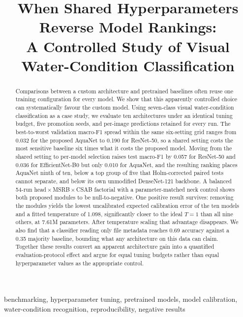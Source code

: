 \documentclass[10pt,journal]{IEEEtran}
\title{When Shared Hyperparameters Reverse Model Rankings:\\A Controlled Study of Visual
Water-Condition Classification}
\author{\todo{author names, affiliations and ORCIDs before submission}}
\newcommand{\mf}{macro-F1}
\begin{document}
\maketitle

\begin{abstract}
Comparisons between a custom architecture and pretrained baselines often reuse one training
configuration for every model. We show that this apparently controlled choice can
systematically favour the custom model. Using seven-class visual water-condition
classification as a case study, we evaluate ten architectures under an identical tuning
budget, five promotion seeds, and per-image predictions retained for every run. The
best-to-worst validation \mf{} spread within the same six-setting grid ranges from 0.032 for
the proposed AquaNet to 0.190 for ResNet-50, so a shared setting costs the most sensitive
baseline six times what it costs the proposed model. Moving from the shared setting to
per-model selection raises test \mf{} by 0.057 for ResNet-50 and 0.036 for EfficientNet-B0
but only 0.010 for AquaNet, and the resulting ranking places AquaNet ninth of ten, below a
top group of five that Holm-corrected paired tests cannot separate, and below its own
unmodified DenseNet-121 backbone. A balanced 54-run head\,$\times$\,MSRB\,$\times$\,CSAB
factorial with a parameter-matched neck control shows both proposed modules to be
null-to-negative. One positive result survives: removing the modules yields the lowest
uncalibrated expected calibration error of the ten models and a fitted temperature of 1.098,
significantly closer to the ideal $T\!=\!1$ than all nine others, at 7.61M parameters. After
temperature scaling that advantage disappears. We also find that a classifier reading only
file metadata reaches 0.69 accuracy against a 0.35 majority baseline, bounding what any
architecture on this data can claim. Together these results convert an apparent architecture
gain into a quantified evaluation-protocol effect and argue for equal tuning budgets rather
than equal hyperparameter values as the appropriate control.
\end{abstract}

\begin{IEEEkeywords}
benchmarking, hyperparameter tuning, pretrained models, model calibration,
water-condition recognition, reproducibility, negative results
\end{IEEEkeywords}

\end{document}
